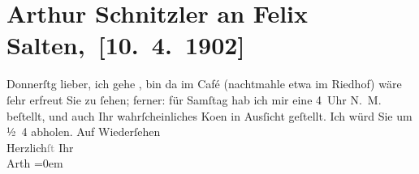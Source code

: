 

         
         \renewcommand{\erwaehntePersonen}{Personen: Felix Salten, Felix Schlichter}
         \renewcommand{\erwaehnteOrte}{Orte: Riedhof, Wien}
         \renewcommand{\erwaehnteWerke}{Werke: Der Erbförster, Tagebuch}
               \section[ Arthur Schnitzler an Felix Salten, {[}10. 4. 1902{]}]{ Arthur Schnitzler an Felix Salten, {[}10. 4. 1902{]}}\nopagebreak{}\rehead{ }\begin{ledgroupsized}[t]{13cm}\normalsize\beginnumbering \toendnotes[C]{\smallbreak\pagebreak[2]} 
\toendnotes[C]{\smallbreak}\pstart
           \raggedleft{}{\pb}Donnerſtg\pend
           \pstart
           lieber, ich gehe \label{K_L02973-1v}\label{K_L02973-1h}, bin da{\geminationn} im Café (nachtmahle etwa im Riedhof) wäre ſehr erfreut Sie zu ſehen; ferner: für Samſtag hab ich mir eine \label{K_L02973-2v}\label{K_L02973-2h}{ }4 Uhr N. M. beſtellt, und auch Ihr wahrſcheinliches Ko{\geminationm}en in Ausſicht geſtellt. Ich würd Sie um
                  ½ 4 abholen.\pend
           \pstart
           Auf Wiederſehen {\\[\baselineskip]}Herzlich\textcolor{gray}{ſt} Ihr {\\[\baselineskip]}\spacefill\mbox{Arth}\pend
           \leftskip=0em{}
         
         \endnumbering{}\end{ledgroupsized}  \newcommand{\dateiname}{L02973}\newcommand{\titel}{Arthur Schnitzler an Felix Salten, [10. 4. 1902]}\newcommand{\editorInnen}{Martin Anton Müller und Laura Untner}
      